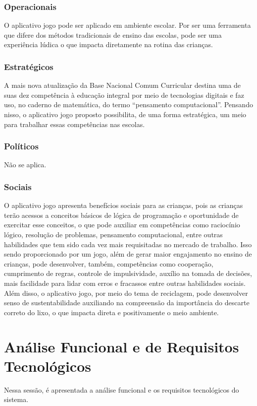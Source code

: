         \subsubsection{Operacionais}
        O aplicativo jogo pode ser aplicado em ambiente escolar. Por ser uma ferramenta que difere dos métodos tradicionais de ensino das escolas, pode ser uma experiência lúdica o que impacta diretamente na rotina das crianças.
        
        \subsubsection{Estratégicos}
        A mais nova atualização da Base Nacional Comum Curricular destina uma de suas dez competência à educação integral por meio de tecnologias digitais e faz uso, no caderno de matemática, do termo “pensamento computacional”. Pensando nisso, o aplicativo jogo proposto possibilita, de uma forma estratégica, um meio para trabalhar essas competências nas escolas. 
        
        \subsubsection{Políticos}
        Não se aplica.

        \subsubsection{Sociais}
        O aplicativo jogo apresenta benefícios sociais para as crianças, pois as crianças terão acessos a conceitos básicos de lógica de programação e oportunidade de exercitar esse conceitos, o que pode auxiliar em competências como raciocínio lógico, resolução de problemas, pensamento computacional, entre outras habilidades que tem sido cada vez mais requisitadas no mercado de trabalho. 
        Isso sendo proporcionado por um jogo, além de gerar maior engajamento no ensino de crianças, pode desenvolver, também, competências como cooperação, cumprimento de regras, controle de impulsividade, auxílio na tomada de decisões, mais facilidade para lidar com erros e fracassos entre outras habilidades sociais.
        Além disso, o aplicativo jogo, por meio do tema de reciclagem, pode desenvolver senso de sustentabilidade auxiliando na compreensão da importância do descarte correto do lixo, o que impacta direta e positivamente  o meio ambiente.

\section{Análise Funcional e de Requisitos Tecnológicos}
    Nessa sessão, é apresentada a análise funcional e os requisitos tecnológicos do sistema.

